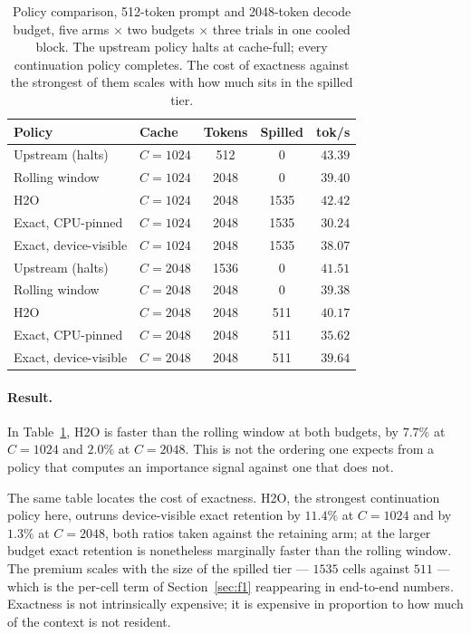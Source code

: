 \documentclass[manuscript,anonymous,review]{acmart}
\begin{document}
\begin{table}[t]
  \centering
  \caption{Policy comparison, 512-token prompt and 2048-token decode
  budget, five arms $\times$ two budgets $\times$ three trials in one
  cooled block. The upstream policy halts at cache-full; every
  continuation policy completes. The cost of exactness against the
  strongest of them scales with how much sits in the spilled tier.}
  \label{tab:policy}
  \renewcommand{\arraystretch}{1.25}
  \begin{tabular}{@{}llccr@{}}
    \toprule
    \textbf{Policy} & \textbf{Cache} & \textbf{Tokens} &
      \textbf{Spilled} & \textbf{tok/s} \\
    \midrule
    Upstream (halts)          & $C = 1024$ &  512 &    0 & $43.39$ \\
    Rolling window            & $C = 1024$ & 2048 &    0 & $39.40$ \\
    H2O                       & $C = 1024$ & 2048 & 1535 & $42.42$ \\
    Exact, CPU-pinned         & $C = 1024$ & 2048 & 1535 & $30.24$ \\
    Exact, device-visible     & $C = 1024$ & 2048 & 1535 & $38.07$ \\
    \midrule
    Upstream (halts)          & $C = 2048$ & 1536 &    0 & $41.51$ \\
    Rolling window            & $C = 2048$ & 2048 &    0 & $39.38$ \\
    H2O                       & $C = 2048$ & 2048 &  511 & $40.17$ \\
    Exact, CPU-pinned         & $C = 2048$ & 2048 &  511 & $35.62$ \\
    Exact, device-visible     & $C = 2048$ & 2048 &  511 & $39.64$ \\
    \bottomrule
  \end{tabular}
\end{table}

\paragraph{Result.} In Table~\ref{tab:policy}, H2O is faster than the
rolling window at both budgets, by $7.7\%$ at $C = 1024$ and $2.0\%$ at
$C = 2048$. This is
not the ordering one expects from a policy that computes an importance
signal against one that does not.

The same table locates the cost of exactness. H2O, the strongest
continuation policy here, outruns device-visible exact retention by
$11.4\%$ at $C = 1024$ and by $1.3\%$ at $C = 2048$, both ratios taken
against the retaining arm; at the larger budget exact retention is
nonetheless marginally faster than the rolling window.
The premium scales with the size of the spilled tier --- $1535$ cells
against $511$ --- which is the per-cell term of
Section~\ref{sec:f1} reappearing in end-to-end numbers. Exactness is
not intrinsically expensive; it is expensive in proportion to how much
of the context is not resident.
\end{document}
